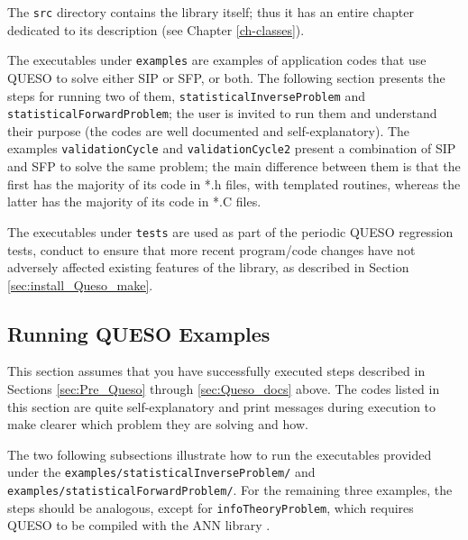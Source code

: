 The \verb+src+ directory contains the library itself; thus it has an entire chapter dedicated to its description (see Chapter \ref{ch-classes}).

The executables under \verb+examples+ are examples of application codes that use QUESO to solve either SIP or SFP, or both. The following section presents the steps for running two of them, \verb+statisticalInverseProblem+ and \verb+statisticalForwardProblem+; the user is invited to run them and understand their purpose (the codes are well documented and self-explanatory). The examples \verb+validationCycle+ and \verb+validationCycle2+ present a combination of SIP and SFP to solve the same problem; the main difference between them is that the first has the majority of its code in *.h files, with templated routines, whereas the latter has the majority of its code in *.C files.


The executables under \verb+tests+ are used as part of the periodic QUESO regression tests, conduct to ensure that more recent program/code
changes have not adversely affected existing features of the library, as described in Section \ref{sec:install_Queso_make}.


% 


\subsection{Running QUESO Examples} \label{sc-running-execs}

This section assumes that you have successfully executed steps described in Sections \ref{sec:Pre_Queso} through \ref{sec:Queso_docs} above.
The codes listed in this section are quite self-explanatory and print messages during execution to make clearer which problem they are solving and how. 


The two following subsections illustrate how to run the executables provided under the \verb+examples/statisticalInverseProblem/+ and \verb+examples/statisticalForwardProblem/+. For the remaining three examples, the steps should be analogous, except for \verb+infoTheoryProblem+, which requires QUESO to be compiled with the ANN library \cite{ANN}.


